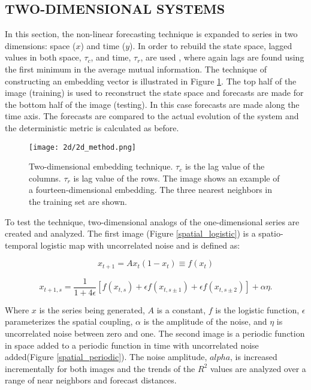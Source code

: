 
\newpage

\subsection{TWO-DIMENSIONAL SYSTEMS}

In this section, the non-linear forecasting technique is expanded to series in two dimensions: space ($x$) and time ($y$). In order to rebuild the state space, lagged values in both space, $\tau_c$, and time, $\tau_r$, are used \cite{original_rubin} \cite{rubin_lagged_vals}, where again lags are found using the first minimum in the average mutual information. The technique of constructing an embedding vector is illustrated in Figure \ref{2d_method}. The top half of the image (training) is used to reconstruct the state space and forecasts are made for the bottom half of the image (testing).  In this case forecasts are made along the time axis. The forecasts are compared to the actual evolution of the system and the deterministic metric is calculated as before.

\begin{figure}[htbp]  %
   \centering
   \texttt{[image: 2d/2d\_method.png]} 
   \caption{Two-dimensional embedding technique. $\tau_c$ is the lag value of the columns. $\tau_r$ is lag value of the rows. The image shows an example of a fourteen-dimensional embedding. The three nearest neighbors in the training set are shown.}
   \label{2d_method}
\end{figure}

To test the technique, two-dimensional analogs of the one-dimensional series are created and analyzed. The first image (Figure \ref{spatial_logistic}) is a spatio-temporal logistic map with uncorrelated noise and is defined as:

$$x_{t+1} = Ax_t(1-x_t)\equiv f(x_t)$$

$$x_{t+1,s} = \frac{1}{1+4\epsilon}[f(x_{t,s})+\epsilon f(x_{t,s\pm1}) + \epsilon f(x_{t,s\pm2})] +\alpha\eta.$$

Where $x$ is the series being generated, $A$ is a constant, $f$ is the logistic function, $\epsilon$ parameterizes the spatial coupling, $\alpha$ is the amplitude of the noise, and $\eta$ is uncorrelated noise between zero and one. The second image is a periodic function in space added to a periodic function in time with uncorrelated noise added(Figure \ref{spatial_periodic}). The noise amplitude, $alpha$, is increased incrementally for both images and the trends of the $R^2$ values are analyzed over a range of near neighbors and forecast distances.

